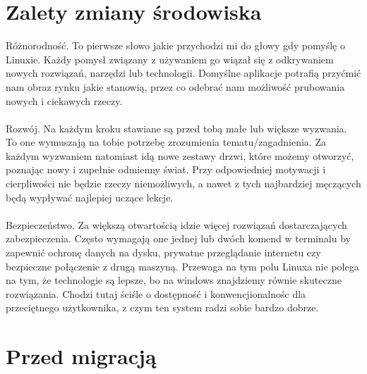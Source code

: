 \documentclass[10pt,a4paper]{report}
\begin{document}
	\section{Zalety zmiany środowiska}
	
Różnorodność. To pierwsze słowo jakie przychodzi mi do głowy gdy pomyślę o Linuxie. Każdy pomysł związany z używaniem go wiązał się z odkrywaniem nowych rozwiązań, narzędzi lub technologii. Domyślne aplikacje potrafią przyćmić nam obraz rynku jakie stanowią, przez co odebrać nam możliwość prubowania nowych i ciekawych rzeczy.\\\\
Rozwój. Na każdym kroku stawiane są przed tobą małe lub większe wyzwania. To one wymuszają na tobie potrzebę zrozumienia tematu/zagadnienia. Za każdym wyzwaniem natomiast idą nowe zestawy drzwi, które możemy otworzyć, poznając nowy i zupełnie odmienny świat. Przy odpowiedniej motywacji i cierpliwości nie będzie rzeczy niemożliwych, a nawet z tych najbardziej męczących będą wypływać najlepiej uczące lekcje.\\\\
Bezpieczeństwo. Za większą otwartością idzie więcej rozwiązań dostarczających zabezpieczenia. Często wymagają one jednej lub dwóch komend w terminalu by zapewnić ochronę danych na dysku, prywatne przeglądanie internetu czy bezpieczne połączenie z drugą maszyną. Przewaga na tym polu Linuxa nie polega na tym, że technologie są lepsze, bo na windows znajdziemy równie skuteczne rozwiązania. Chodzi tutaj ściśle o dostępność i konwencjionalnośc dla przeciętnego użytkownika, z czym ten system radzi sobie bardzo dobrze.
	
	\section{Przed migracją}
	
\end{document}
